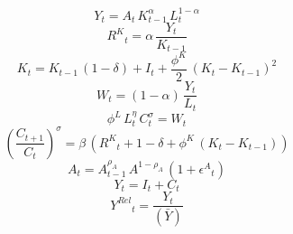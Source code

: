 \noindent[name= `Función de producción']
\begin{dmath}
{Y}_{t}={A}_{t}\, {K}_{t-1}^{{\alpha}}\, {L}_{t}^{1-{\alpha}}
\end{dmath}
\noindent[name= `Demanda de capital']
\begin{dmath}
{R^{K}}_{t}={\alpha}\, \frac{{Y}_{t}}{{K}_{t-1}}
\end{dmath}
\noindent[name= `Ley de acumulación de capital']
\begin{dmath}
{K}_{t}={K}_{t-1}\, \left(1-{\delta}\right)+{I}_{t}+\frac{{\phi^{K}}}{2}\, \left({K}_{t}-{K}_{t-1}\right)^{2}
\end{dmath}
\noindent[name= `Demanda de trabajo']
\begin{dmath}
{W}_{t}=\left(1-{\alpha}\right)\, \frac{{Y}_{t}}{{L}_{t}}
\end{dmath}
\noindent[name= `Oferta de trabajo']
\begin{dmath}
{\phi^{L}}\, {L}_{t}^{{\eta}}\, {C}_{t}^{{\sigma}}={W}_{t}
\end{dmath}
\noindent[name= `Ecuación de Euler']
\begin{dmath}
\left(\frac{{C}_{t+1}}{{C}_{t}}\right)^{{\sigma}}={\beta}\, \left({R^{K}}_{t}+1-{\delta}+{\phi^{K}}\, \left({K}_{t}-{K}_{t-1}\right)\right)
\end{dmath}
\noindent[name= `Productividad']
\begin{dmath}
{A}_{t}={A}_{t-1}^{{\rho_{A}}}\, {A}^{1-{\rho_{A}}}\, \left(1+{\epsilon^{A}}_{t}\right)
\end{dmath}
\noindent[name= `Demanda agregada']
\begin{dmath}
{Y}_{t}={I}_{t}+{C}_{t}
\end{dmath}
\noindent[name= `Producción relativa al SS']
\begin{dmath}
{Y^{Rel}}_{t}=\frac{{Y}_{t}}{(\bar{Y})}
\end{dmath}
